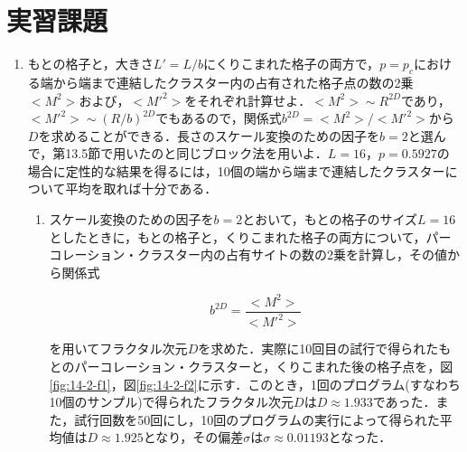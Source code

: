 \documentclass{jsarticle}
\begin{document}
            \newpage
            
            
    \section{実習課題}
    
        \begin{enumerate}
            \renewcommand{\labelenumi}{\alph{enumi}.}
            \renewcommand{\labelenumii}{}
            
            \item もとの格子と，大きさ$L' = L/b$にくりこまれた格子の両方で，$p=p_{c}$における端から端まで連結したクラスター内の占有された格子点の数の2乗$<M^{2}>$および，$<M'^{2}>$をそれぞれ計算せよ．$<M^{2}> \sim R^{2D}$であり，$<M'^{2}> \sim (R/b)^{2D}$でもあるので，関係式$b^{2D} = <M^{2}>/<M'^{2}>$から$D$を求めることができる．長さのスケール変換のための因子を$b=2$と選んで，第13.5節で用いたのと同じブロック法を用いよ．$L=16$，$p=0.5927$の場合に定性的な結果を得るには，10個の端から端まで連結したクラスターについて平均を取れば十分である．
                
                \begin{enumerate}
                    \item スケール変換のための因子を$b=2$とおいて，もとの格子のサイズ$L=16$としたときに，もとの格子と，くりこまれた格子の両方について，パーコレーション・クラスター内の占有サイトの数の2乗を計算し，その値から関係式
                    
                    \begin{equation}
                        b^{2D} = \frac{<M^{2}>}{<M'^{2}>}
                    \end{equation}
                    
                    を用いてフラクタル次元$D$を求めた．実際に10回目の試行で得られたもとのパーコレーション・クラスターと，くりこまれた後の格子点を，図\ref{fig:14-2-f1}，図\ref{fig:14-2-f2}に示す．このとき，1回のプログラム(すなわち10個のサンプル)で得られたフラクタル次元$D$は$D \approx 1.933$であった．また，試行回数を50回にし，10回のプログラムの実行によって得られた平均値は$D \approx 1.925$となり，その偏差$\sigma$は$\sigma \approx 0.01193$となった．


\end{enumerate}
\end{enumerate}
\end{document}
